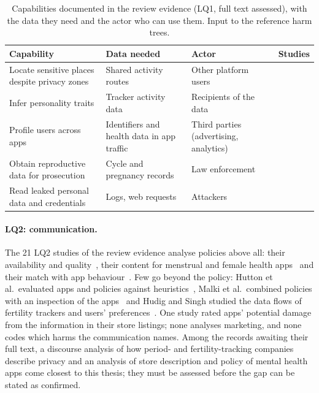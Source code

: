 \begin{table}[tbp]
\centering
\begin{singlespace}
\caption[Capabilities documented in the review evidence]{Capabilities
documented in the review evidence (LQ1, full text assessed), with the data they
need and the actor who can use them. Input to the reference harm trees.}
\label{tab:lit-capabilities}
\small
\begin{tabularx}{\textwidth}{@{}>{\raggedright\arraybackslash}X>{\raggedright\arraybackslash}p{3.0cm}>{\raggedright\arraybackslash}p{2.8cm}>{\raggedright\arraybackslash}p{2.4cm}@{}}
\toprule
\textbf{Capability} & \textbf{Data needed} & \textbf{Actor} & \textbf{Studies} \\
\midrule
Locate sensitive places despite privacy zones & Shared activity routes & Other platform users & \cite{hassan2018analysis,dhondt2022run} \\
Infer personality traits & Tracker activity data & Recipients of the data & \cite{zufferey2023watch} \\
Profile users across apps & Identifiers and health data in app traffic & Third parties (advertising, analytics) & \cite{huckvale2015unaddressed,huckvale2019assessment,grundy2019data,tangari2021mobile} \\
Obtain reproductive data for prosecution & Cycle and pregnancy records & Law enforcement & \cite{cao2024deleted,malki2024exploring} \\
Read leaked personal data and credentials & Logs, web requests & Attackers & \cite{iwaya2023privacy} \\
\bottomrule
\end{tabularx}
\end{singlespace}
\end{table}

\paragraph{LQ2: communication.} The 21 LQ2 studies of the review evidence
analyse policies above all: their availability and
quality~\parencite{sunyaev2015availability,robillard2019availability,oloughlin2019reviewing},
their content for menstrual and female health apps~\parencite{shipp2020period,malki2024exploring}
and their match with app behaviour~\parencite{huckvale2019assessment,tangari2021mobile}.
Few go beyond the policy: Hutton et al.\ evaluated apps and policies against
heuristics~\parencite{hutton2018assessing}, Malki et al.\ combined policies
with an inspection of the apps~\parencite{malki2024exploring} and Hudig and
Singh studied the data flows of fertility trackers and users'
preferences~\parencite{hudig2025intimate}. One study rated apps' potential
damage from the information in their store listings; none analyses marketing,
and none codes which harms the communication names. Among the records awaiting
their full text, a discourse analysis of how period- and fertility-tracking
companies describe privacy and an analysis of store description and policy of
mental health apps come closest to this thesis; they must be assessed before
the gap can be stated as confirmed.

